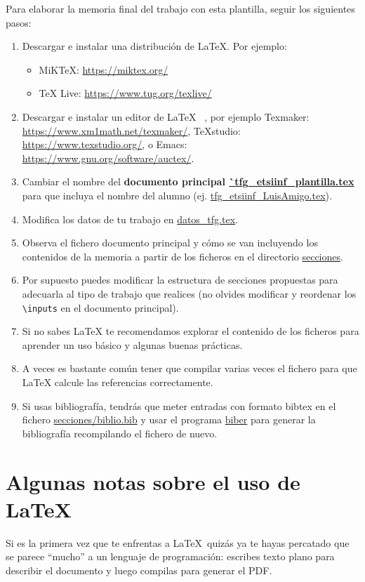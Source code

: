 Para elaborar la memoria final del trabajo con esta plantilla, seguir los siguientes pasos:
\begin{enumerate}
\item Descargar e instalar una distribución de \LaTeX. Por ejemplo:
  \begin{itemize}
  \item MiKTeX:  \url{https://miktex.org/}
  \item TeX Live: \url{https://www.tug.org/texlive/}
  \end{itemize}
\item Descargar e instalar un editor de \LaTeX~ , por ejemplo
  Texmaker: \url{https://www.xm1math.net/texmaker/}, TeXstudio:
  \url{https://www.texstudio.org/}, o Emacs:
  \url{https://www.gnu.org/software/auctex/}.
\item Cambiar el nombre del \textbf{documento principal
    \url{`tfg_etsiinf_plantilla.tex}} para que incluya el nombre del
  alumno (ej. \url{tfg_etsiinf_LuisAmigo.tex}).
\item Modifica los datos de tu trabajo en \url{datos_tfg.tex}.
\item Observa el fichero documento principal y cómo se van incluyendo
  los contenidos de la memoria a partir de los ficheros en el
  directorio \url{secciones}.
\item Por supuesto puedes modificar la estructura de secciones
  propuestas para adecuarla al tipo de trabajo que realices (no
  olvides modificar y reordenar los \verb|\inputs| en el documento
  principal).
\item Si no sabes LaTeX te recomendamos explorar el contenido de los
  ficheros para aprender un uso básico y algunas buenas prácticas.
\item A veces es bastante común tener que compilar varias veces el
  fichero para que LaTeX calcule las referencias correctamente.
\item Si usas bibliografía, tendrás que meter entradas con formato
  bibtex en el fichero \url{secciones/biblio.bib} y usar el programa
  \url{biber} para generar la bibliografía recompilando el fichero de
  nuevo.
\end{enumerate}

\section{Algunas notas sobre el uso de \LaTeX}
\label{sec:latex}

Si es la primera vez que te enfrentas a \LaTeX\ quizás ya te hayas
percatado que se parece ``mucho'' a un lenguaje de programación:
escribes texto plano para describir el documento y luego compilas para
generar el PDF.


